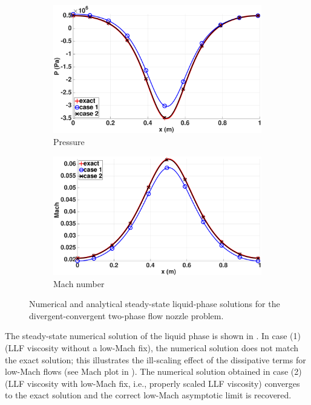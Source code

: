 \begin{figure}[H]
        \begin{subfigure}[b]{0.495\textwidth}
                \centering
                \includegraphics[width=\textwidth]{figures/liquid_pressure_llf_and_exact_100.eps}
                \caption{Pressure}
                \label{fig:liq-phase-press}
        \end{subfigure}        
        \begin{subfigure}[b]{0.495\textwidth}
                \centering
                \includegraphics[width=\textwidth]{figures/liquid_mach_llf_and_exact_100.eps}
                \caption{Mach number}
                \label{fig:liq-phase-mach}
        \end{subfigure}
        \caption{Numerical and analytical steady-state liquid-phase solutions for the divergent-convergent two-phase flow nozzle problem.}\label{fig:liq-phase}
\end{figure}
%
The steady-state numerical solution of the liquid phase is shown in .
In case (1) (LLF viscosity without a low-Mach fix), the numerical solution does not match the exact solution; this illustrates the ill-scaling effect of the 
dissipative terms for low-Mach flows (see Mach plot in  ). The numerical solution obtained in case (2) (LLF viscosity with low-Mach fix,
i.e., properly scaled LLF viscosity) converges to the exact solution and the correct low-Mach asymptotic limit is recovered. 
%

